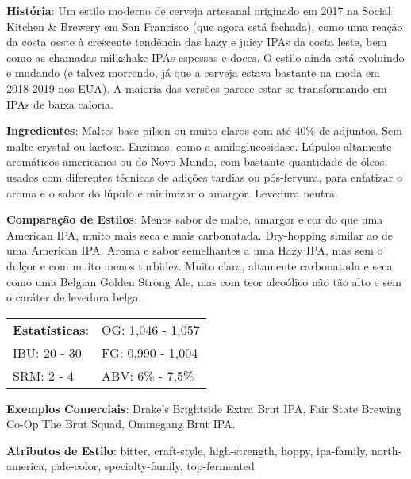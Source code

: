 \textbf{História}: Um estilo moderno de cerveja artesanal originado em 2017 na Social Kitchen \& Brewery em San Francisco (que agora está fechada), como uma reação da costa oeste à crescente tendência das hazy e juicy IPAs da costa leste, bem como as chamadas milkshake IPAs espessas e doces. O estilo ainda está evoluindo e mudando (e talvez morrendo, já que a cerveja estava bastante na moda em 2018-2019 nos EUA). A maioria das versões parece estar se transformando em IPAs de baixa caloria.

\textbf{Ingredientes}: Maltes base pilsen ou muito claros com até 40\% de adjuntos. Sem malte crystal ou lactose. Enzimas, como a amiloglucosidase. Lúpulos altamente aromáticos americanos ou do Novo Mundo, com bastante quantidade de óleos, usados com diferentes técnicas de adições tardias ou pós-fervura, para enfatizar o aroma e o sabor do lúpulo e minimizar o amargor. Levedura neutra.

\textbf{Comparação de Estilos}: Menos sabor de malte, amargor e cor do que uma American IPA, muito mais seca e mais carbonatada. Dry-hopping similar ao de uma American IPA. Aroma e sabor semelhantes a uma Hazy IPA, mas sem o dulçor e com muito menos turbidez. Muito clara, altamente carbonatada e seca como uma Belgian Golden Strong Ale, mas com teor alcoólico não tão alto e sem o caráter de levedura belga.

\begin{tabular}{@{}p{35mm}p{35mm}@{}}
  \textbf{Estatísticas}: & OG: 1,046 - 1,057 \\
  IBU: 20 - 30  & FG: 0,990 - 1,004 \\
  SRM: 2 - 4  & ABV: 6\% - 7,5\%
\end{tabular}

\textbf{Exemplos Comerciais}: Drake's Brightside Extra Brut IPA, Fair State Brewing Co-Op The Brut Squad, Ommegang Brut IPA.

\textbf{Atributos de Estilo}: bitter, craft-style, high-strength, hoppy, ipa-family, north-america, pale-color, specialty-family, top-fermented
